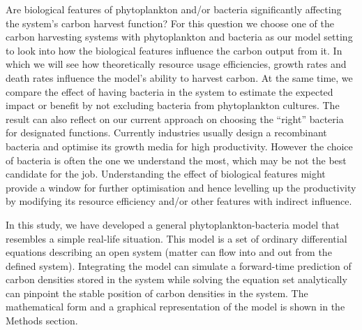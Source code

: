 \documentclass[../thesis.tex]{subfiles} %
\begin{document}
Are biological features of phytoplankton and/or bacteria significantly affecting the system’s carbon harvest function?  For this question we choose one of the carbon harvesting systems with phytoplankton and bacteria as our model setting to look into how the biological features influence the carbon output from it.  In which we will see how theoretically resource usage efficiencies, growth rates and death rates influence the model’s ability to harvest carbon.  At the same time, we compare the effect of having bacteria in the system to estimate the expected impact or benefit by not excluding bacteria from phytoplankton cultures.  The result can also reflect on our current approach on choosing the “right” bacteria for designated functions.  Currently industries usually design a recombinant bacteria and optimise its growth media for high productivity.  However the choice of bacteria is often the one we understand the most, which may be not the best candidate for the job.  Understanding the effect of biological features might provide a window for further optimisation and hence levelling up the productivity by modifying its resource efficiency and/or other features with indirect influence.

In this study, we have developed a general phytoplankton-bacteria model that resembles a simple real-life situation.  This model is a set of ordinary differential equations describing an open system (matter can flow into and out from the defined system).  Integrating the model can simulate a forward-time prediction of carbon densities stored in the system while solving the equation set analytically can pinpoint the stable position of carbon densities in the system.  The mathematical form and a graphical representation of the model is shown in the Methods section.
\end{document}
